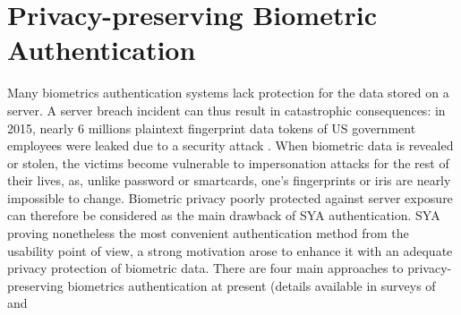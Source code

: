 \section{Privacy-preserving Biometric Authentication}
\label{sec:privacyLiteratures}
Many biometrics authentication systems lack protection for the data
stored on a server. A server breach incident can thus result in catastrophic
consequences: in 2015, nearly 6 millions plaintext fingerprint data tokens of US
government employees were leaked due to a security attack
\cite{OPMsays563:online}. When biometric data is revealed or stolen, the victims become vulnerable to impersonation attacks for the rest of their lives, as, unlike password or smartcards, one’s fingerprints or iris are nearly impossible to change. Biometric privacy poorly protected against server exposure can therefore be considered as the main drawback of SYA authentication. SYA proving nonetheless the most convenient authentication method from the usability point of view, a strong
motivation arose to enhance it with an adequate privacy protection of
biometric data. There are four main approaches to privacy-preserving biometrics
authentication at present (details available in surveys of \cite{jain201650} and
